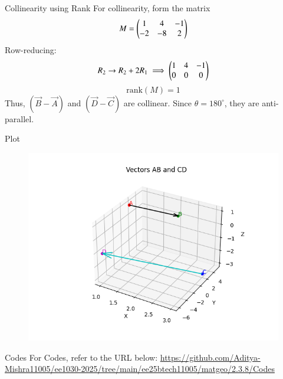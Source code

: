 \documentclass{beamer}
\begin{document}
\begin{frame}{Collinearity using Rank}
For collinearity, form the matrix
\[
M = \begin{pmatrix}1 & 4 & -1 \\ -2 & -8 & 2\end{pmatrix}
\]
Row-reducing:
\[
R_2 \to R_2 + 2R_1 \implies \begin{pmatrix}1 & 4 & -1 \\ 0 & 0 & 0\end{pmatrix}
\]
\[
\text{rank}(M) = 1
\]
Thus, $(\vec{B}-\vec{A})$ and $(\vec{D}-\vec{C})$ are collinear.  
Since $\theta = 180^\circ$, they are anti-parallel.
\end{frame}

\begin{frame}{Plot}
\begin{figure}
    \centering
    \includegraphics[width=0.8\columnwidth]{Figs/Figure.png}
\end{figure}
\end{frame}

\begin{frame}{Codes}
\centering
For Codes, refer to the URL below:  
\url{https://github.com/Aditya-Mishra11005/ee1030-2025/tree/main/ee25btech11005/matgeo/2.3.8/Codes}
\end{frame}
\end{document}
